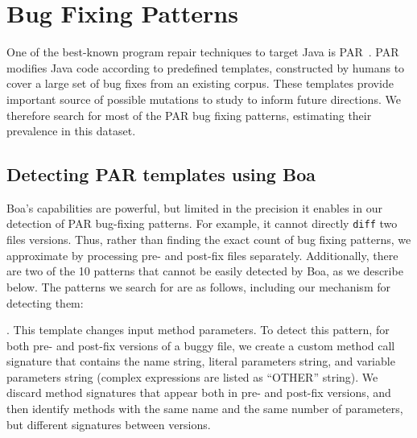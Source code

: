 \documentclass{sig-alternate-05-2015}
\begin{document}
\section{Bug Fixing Patterns}\label{sec:method}

One of the best-known program repair techniques to target Java is
PAR~\cite{kim2013}.  PAR
modifies Java code according to predefined templates, constructed by humans
to cover a large set of bug fixes from an existing corpus.  These templates provide
important source of possible 
mutations to study to inform future directions. 
We therefore search for most of the PAR bug fixing patterns,
estimating their prevalence in this
dataset.


\subsection{Detecting PAR templates using Boa}

Boa's capabilities are powerful, but limited in the precision it enables in
our detection of PAR bug-fixing patterns. For example, it cannot directly \texttt{diff}
two files versions. Thus, rather than finding the exact count of
bug fixing patterns, we approximate by processing pre- and
post-fix files separately.  Additionally, there are
two of the 10 patterns that cannot be easily detected by
Boa, as we describe below. 
%
The patterns we search for are as follows, including our mechanism for
detecting them:

\vspace{1ex}
.  This template changes 
input method parameters. %
To detect this pattern, for both pre- and post-fix versions
of a buggy file, we create a custom method call signature that
contains the name string, literal parameters string, and variable parameters string (complex
expressions are listed as ``OTHER'' string).
We discard method signatures that appear both in pre- and post-fix
versions, and then identify methods with the same name and the
same number of parameters, but different signatures between versions. 
\end{document}
